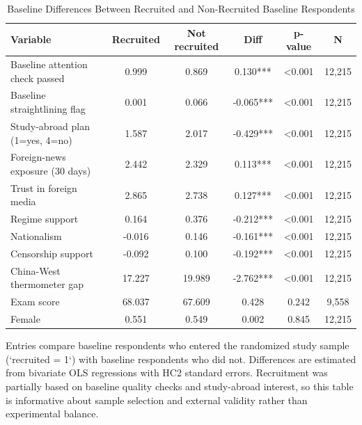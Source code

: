 \begin{table}[H]
\centering
\caption{Baseline Differences Between Recruited and Non-Recruited Baseline Respondents}
\label{tab:recruitment_selection}
\footnotesize
\begin{threeparttable}
\begin{tabular}{lccccc}
\toprule
Variable & Recruited & Not recruited & Diff & p-value & N \\
\midrule
Baseline attention check passed & 0.999 & 0.869 & 0.130*** & <0.001 & 12,215 \\
Baseline straightlining flag & 0.001 & 0.066 & -0.065*** & <0.001 & 12,215 \\
Study-abroad plan (1=yes, 4=no) & 1.587 & 2.017 & -0.429*** & <0.001 & 12,215 \\
Foreign-news exposure (30 days) & 2.442 & 2.329 & 0.113*** & <0.001 & 12,215 \\
Trust in foreign media & 2.865 & 2.738 & 0.127*** & <0.001 & 12,215 \\
Regime support & 0.164 & 0.376 & -0.212*** & <0.001 & 12,215 \\
Nationalism & -0.016 & 0.146 & -0.161*** & <0.001 & 12,215 \\
Censorship support & -0.092 & 0.100 & -0.192*** & <0.001 & 12,215 \\
China-West thermometer gap & 17.227 & 19.989 & -2.762*** & <0.001 & 12,215 \\
Exam score & 68.037 & 67.609 & 0.428 & 0.242 & 9,558 \\
Female & 0.551 & 0.549 & 0.002 & 0.845 & 12,215 \\
\bottomrule
\end{tabular}
\begin{tablenotes}[flushleft]
\footnotesize
\item Entries compare baseline respondents who entered the randomized study sample (`recruited = 1`) with baseline respondents who did not. Differences are estimated from bivariate OLS regressions with HC2 standard errors. Recruitment was partially based on baseline quality checks and study-abroad interest, so this table is informative about sample selection and external validity rather than experimental balance.
\end{tablenotes}
\end{threeparttable}
\end{table}
